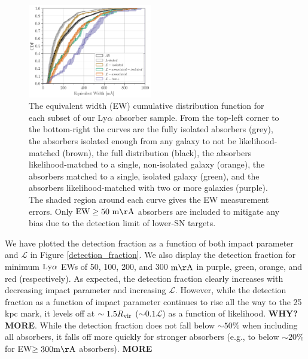 \documentclass[twocolumn,tighten]{aastex62}
\begin{document}
\begin{figure}[ht!]
        \centering
        \vspace{15pt}
        \includegraphics[width=0.48\textwidth]{hist(EW)_bins10_6_EWcut50-15000_err_dataset_double.pdf}
        \caption{\small{The equivalent width (EW) cumulative distribution function for each subset of our Ly$\alpha$ absorber sample. From the top-left corner to the bottom-right the curves are the fully isolated absorbers (grey), the absorbers isolated enough from any galaxy to not be likelihood-matched (brown), the full distribution (black), the absorbers likelihood-matched to a single, non-isolated galaxy (orange), the absorbers matched to a single, isolated galaxy (green), and the absorbers likelihood-matched with two or more galaxies (purple). The shaded region around each curve gives the EW measurement errors. Only $\rm EW \ge 50~m\AA$ absorbers are included to mitigate any bias due to the detection limit of lower-SN targets.}}
        \vspace{0pt}
        \label{cdf_ew}
\end{figure}


We have plotted the detection fraction as a function of both impact parameter and $\mathcal{L}$ in Figure \ref{detection_fraction}. We also display the detection fraction for minimum $\rm Ly\alpha$ EWs of 50, 100, 200, and 300 $\rm m\AA$ in purple, green, orange, and red (respectively). As expected, the detection fraction clearly increases with decreasing impact parameter and increasing $\mathcal{L}$. However, while the detection fraction as a function of impact parameter continues to rise all the way to the 25 kpc mark, it levels off at $\sim 1.5 R_{\rm vir}$ ($\sim 0.1 \mathcal{L}$) as a function of likelihood. \textbf{WHY? MORE}. While the detection fraction does not fall below $\sim 50\%$ when including all absorbers, it falls off more quickly for stronger absorbers (e.g., to below $\sim 20\%$ for EW$\rm \ge 300 m\AA$ absorbers). \textbf{MORE}
\end{document}
